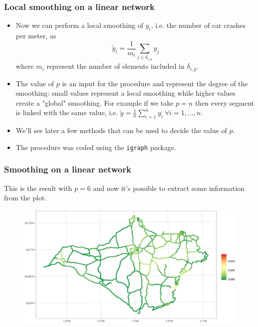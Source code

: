 \documentclass[c,10pt,pdftex]{beamer}
\begin{document}
\begin{frame}
\frametitle{Local smoothing on a linear network}
\vspace{-0.5cm}
\begin{itemize}
	\setlength\itemsep{1em}
	\item Now we can perform a local smoothing of $y_i$, i.e. the number of car crashes per meter, as
	\[
	\tilde{y}_i = \frac{1}{m_i}\sum_{j \in \delta_{i, p}} y_{j} 
	\]
	where $m_i$ represent the number of elements included in $\delta_{i, p}$. 
	
	\item The value of $p$ is an input for the procedure and represent the degree of the smoothing: small values represent a local smoothing while higher values create a "global" smoothing. For example if we take $p = n$ then every segment is linked with the same value, i.e. $\tilde{y} = \frac{1}{n}\sum_{i=1}^{n}y_{i} \ \forall i = 1, \dots, n$. 
	
	\item We'll see later a few methods that can be used to decide the value of $p$. 
	\item The procedure was coded using the \texttt{igraph} package.
\end{itemize}
\end{frame}

\begin{frame}
\frametitle{Smoothing on a linear network}
\vspace{-0.25cm}
This is the result with $p = 6$ and now it's possible to extract some information from the plot. 
\begin{figure}
	\centering
	\includegraphics[width=\linewidth]{images/car_crashes_per_meter_smooth6}
\end{figure}
\end{frame}
\end{document}
